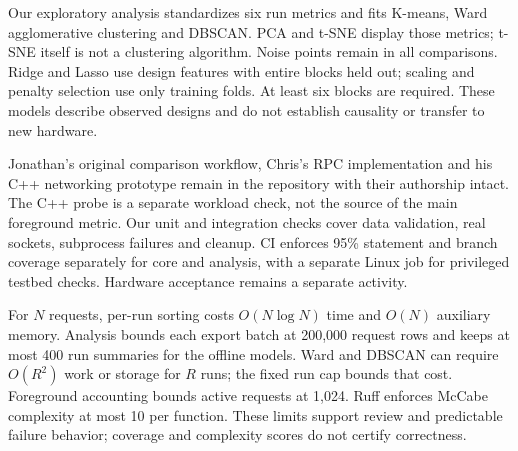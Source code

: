 Our exploratory analysis standardizes six run metrics and fits K-means, Ward
agglomerative clustering and DBSCAN. PCA and t-SNE display those metrics;
t-SNE itself is not a clustering algorithm. Noise points remain in all
comparisons. Ridge and Lasso use design features with entire blocks held out;
scaling and penalty selection use only training folds. At least six blocks
are required. These models describe observed designs and do not establish
causality or transfer to new hardware.

Jonathan's original comparison workflow, Chris's RPC implementation and his
C++ networking prototype remain in the repository with their authorship intact. The C++ probe is a
separate workload check, not the source of the main foreground metric. Our
unit and integration checks cover data validation, real sockets, subprocess
failures and cleanup. CI enforces 95\% statement and branch coverage separately
for core and analysis, with a separate Linux job for privileged testbed checks.
Hardware acceptance remains a separate activity.

For $N$ requests, per-run sorting costs $O(N\log N)$ time and $O(N)$ auxiliary
memory. Analysis bounds each export batch at 200,000 request rows and keeps
at most 400 run summaries for the offline models. Ward and DBSCAN can require
$O(R^2)$ work or storage for $R$ runs; the fixed run cap bounds that cost.
Foreground accounting bounds active requests at 1,024. Ruff enforces McCabe
complexity at most 10 per function. These limits support review and predictable
failure behavior; coverage and complexity scores do not certify correctness.
